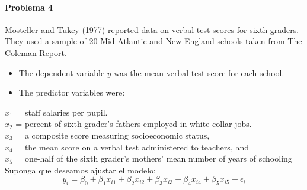 \documentclass[12pt,a4paper]{report}
\begin{document}
\paragraph{Problema 4} 

Mosteller and Tukey (1977) reported data on verbal test scores for sixth graders. They used a sample of 20 Mid Atlantic and New England schools taken from The Coleman Report.\\
\begin{itemize}
	\item The dependent variable $y$ was the mean verbal test score for each school.\\
	\item The predictor variables were:
\end{itemize}

$x_1$ = staff salaries per pupil.\\
$x_2$ = percent of sixth grader’s fathers employed in white collar jobs.\\
$x_3$ = a composite score measuring socioeconomic status,\\
$x_4$ = the mean score on a verbal test administered to teachers, and\\
$x_5$ = one-half of the sixth grader’s mothers’ mean number of years of schooling\\

	Suponga que deseamos ajustar el modelo:
	$$
	y_i = \beta_0 + \beta_1 x_{i1} + \beta_2 x_{i2} + \beta_3 x_{i3} + \beta_4 x_{i4} + \beta_5 x_{i5} + \epsilon_i
	$$
	
	
	
\end{document}
